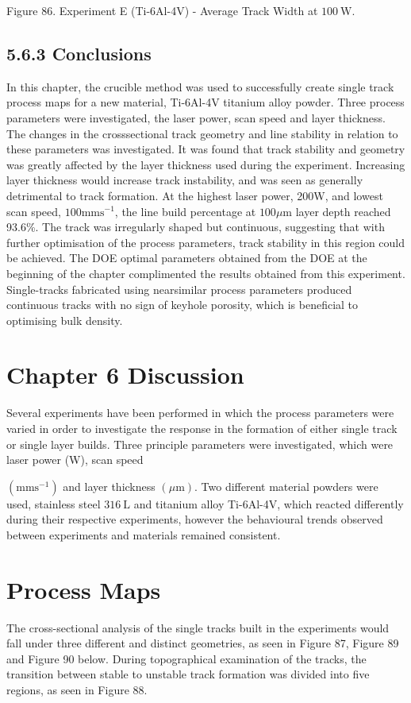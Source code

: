 \documentclass[10pt]{article}
\begin{document}
Figure 86. Experiment E (Ti-6Al-4V) - Average Track Width at $100 \mathrm{~W}$.

\subsection*{5.6.3 Conclusions}
In this chapter, the crucible method was used to successfully create single track process maps for a new material, Ti-6Al-4V titanium alloy powder. Three process parameters were investigated, the laser power, scan speed and layer thickness. The changes in the crosssectional track geometry and line stability in relation to these parameters was investigated. It was found that track stability and geometry was greatly affected by the layer thickness used during the experiment. Increasing layer thickness would increase track instability, and was seen as generally detrimental to track formation. At the highest laser power, 200W, and lowest scan speed, $100 \mathrm{mms}^{-1}$, the line build percentage at $100 \mu \mathrm{m}$ layer depth reached 93.6\%. The track was irregularly shaped but continuous, suggesting that with further optimisation of the process parameters, track stability in this region could be achieved. The DOE optimal parameters obtained from the DOE at the beginning of the chapter complimented the results obtained from this experiment. Single-tracks fabricated using nearsimilar process parameters produced continuous tracks with no sign of keyhole porosity, which is beneficial to optimising bulk density.

\section*{Chapter 6 Discussion}
Several experiments have been performed in which the process parameters were varied in order to investigate the response in the formation of either single track or single layer builds. Three principle parameters were investigated, which were laser power (W), scan speed

$\left(\mathrm{mms}^{-1}\right)$ and layer thickness $(\mu \mathrm{m})$. Two different material powders were used, stainless steel $316 \mathrm{~L}$ and titanium alloy Ti-6Al-4V, which reacted differently during their respective experiments, however the behavioural trends observed between experiments and materials remained consistent.

\section*{Process Maps}
The cross-sectional analysis of the single tracks built in the experiments would fall under three different and distinct geometries, as seen in Figure 87, Figure 89 and Figure 90 below. During topographical examination of the tracks, the transition between stable to unstable track formation was divided into five regions, as seen in Figure 88.
\end{document}
